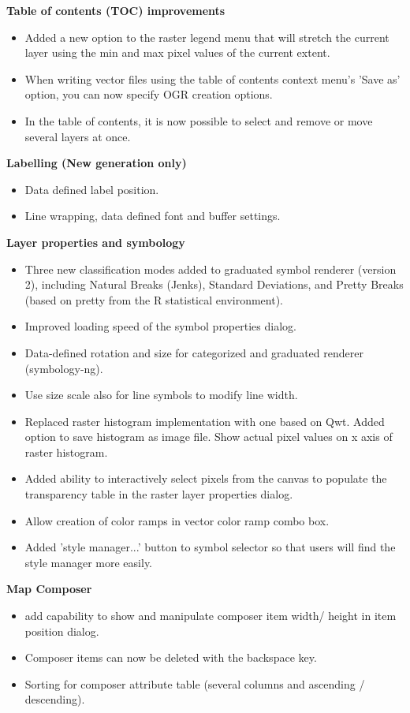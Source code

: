 \textbf{Table of contents (TOC) improvements}

\begin{itemize}[label=--]
\item Added a new option to the raster legend menu that will stretch the current layer using the min and max pixel values of the current extent. 
\item When writing vector files using the table of contents context menu's 'Save as' option, you can now specify OGR creation options. 
\item In the table of contents, it is now possible to select and remove or move several layers at once.
\end{itemize}

\textbf{Labelling (New generation only)}

\begin{itemize}[label=--]
\item Data defined label position. 
\item Line wrapping, data defined font and buffer settings.
\end{itemize}

\textbf{Layer properties and symbology}

\begin{itemize}[label=--]
\item Three new classification modes added to graduated symbol renderer (version 2), including Natural Breaks (Jenks), Standard Deviations, and Pretty Breaks (based on pretty from the R statistical environment). 
\item Improved loading speed of the symbol properties dialog. 
\item Data-defined rotation and size for categorized and graduated renderer (symbology-ng). 
\item Use size scale also for line symbols to modify line width. 
\item Replaced raster histogram implementation with one based on Qwt. Added option to save histogram as image file. Show actual pixel values on x axis of raster histogram. 
\item Added ability to interactively select pixels from the canvas to populate the transparency table in the raster layer properties dialog. 
\item Allow creation of color ramps in vector color ramp combo box. 
\item Added 'style manager...' button to symbol selector so that users will find the style manager more easily.
\end{itemize}

\textbf{Map Composer}

\begin{itemize}[label=--]
\item add capability to show and manipulate composer item width/ height in item position dialog. 
\item Composer items can now be deleted with the backspace key. 
\item Sorting for composer attribute table (several columns and ascending / descending).
\end{itemize}

